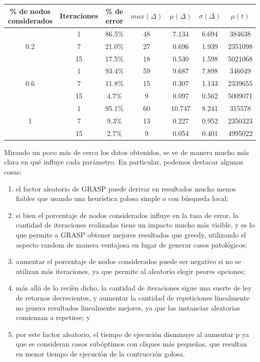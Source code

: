 \begin{center}
    \begin{tabular}{ | c | c | c | c | c | c | c |}
        \hline
        \% de nodos considerados & Iteraciones & \% de error & $max(\Delta)$ & $\mu(\Delta)$ & $\sigma(\Delta)$ & $\mu(t)$ \\ \hline
            &  1 & 86.5\% & 48 &  7.134 & 6.694 &  384638 \\ \cline{2-7}
        0.2 &  7 & 21.0\% & 27 &  0.696 & 1.939 & 2351098 \\ \cline{2-7}
            & 15 & 17.5\% & 18 &  0.530 & 1.598 & 5021068 \\ \hline
            &  1 & 93.4\% & 59 &  9.687 & 7.898 &  346049 \\ \cline{2-7}
        0.6 &  7 & 11.8\% & 15 &  0.307 & 1.133 & 2339655 \\ \cline{2-7}
            & 15 &  4.7\% &  9 &  0.097 & 0.562 & 5009071 \\ \hline
            &  1 & 95.1\% & 60 & 10.747 & 8.241 &  315578 \\ \cline{2-7}
          1 &  7 &  9.3\% & 13 &  0.227 & 0.952 & 2350323 \\ \cline{2-7}
            & 15 &  2.7\% &  9 &  0.054 & 0.401 & 4995022 \\
        \hline
    \end{tabular}
\end{center}

Mirando un poco más de cerca los datos obtenidos, se ve de manera mucho más clara en qué influye cada parámetro. En particular, podemos destacar algunas cosas:

\begin{enumerate}
    \item el factor aleatorio de GRASP puede derivar en resultados mucho menos fiables que usando una heurística golosa simple o con búsqueda local;
    \item si bien el porcentaje de nodos considerados influye en la tasa de error, la cantidad de iteraciones realizadas tiene un impacto mucho más visible, y es lo que permite a GRASP obtener mejores resultados que greedy, utilizando el aspecto random de manera ventajosa en lugar de generar casos patológicos;
    \item aumentar el porcentaje de nodos considerados puede ser negativo si no se utilizan más iteraciones, ya que permite al aleatorio elegir peores opciones;
    \item más allá de lo recíén dicho, la cantidad de iteraciones sigue una suerte de ley de retornos decrecientes, y aumentar la cantidad de repeticiones linealmente no genera resultados linealmente mejores, ya que las instancias aleatorias comienzan a repetirse; y
    \item por este factor aleatorio, el tiempo de ejecución disminuye al aumentar p ya que se consideran casos subóptimos con cliques más pequeñas, que resultan en menor tiempo de ejecución de la contrucción golosa.
\end{enumerate}

